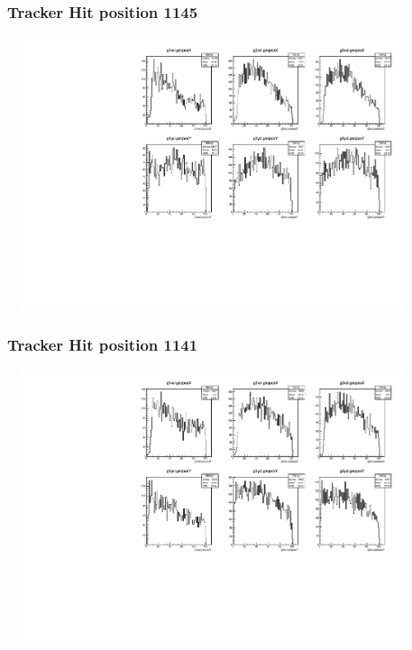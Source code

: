 \documentclass[slidestop,compress,mathserif]{beamer}
\begin{document}
\begin{frame}\frametitle{Tracker Hit position 1145}
	 \includegraphics[width=12cm,height=8cm]{Tracker_Hit_position_1145.pdf}
\end{frame}
\begin{frame}\frametitle{Tracker Hit position 1141}
	 \includegraphics[width=12cm,height=8cm]{Tracker_Hit_position_1141.pdf}
\end{frame}
\end{document}
